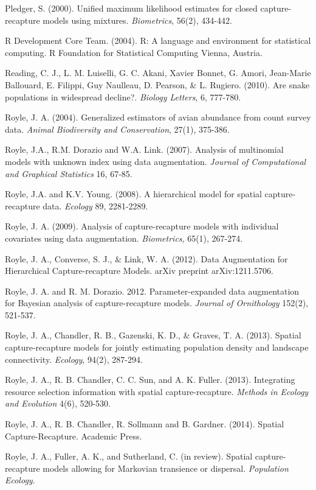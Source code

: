 \documentclass{book}
\begin{document}
\rf Pledger, S. (2000). Unified maximum likelihood estimates for closed capture-recapture models using mixtures. \textit{Biometrics}, 56(2), 434-442.

\rf R Development Core Team. (2004). R: A language and environment for statistical computing. R Foundation for Statistical Computing Vienna, Austria.

\rf Reading, C. J., L. M. Luiselli, G. C. Akani, Xavier Bonnet, G. Amori, Jean-Marie Ballouard, E. Filippi, Guy Naulleau, D. Pearson, \& L. Rugiero. (2010). Are snake populations in widespread decline?. \textit{Biology Letters}, 6, 777-780.

\rf Royle, J. A. (2004). Generalized estimators of avian abundance from count survey data. \textit{Animal Biodiversity and Conservation}, 27(1), 375-386.

\rf Royle, J.A., R.M. Dorazio and W.A. Link. (2007). Analysis of multinomial models with unknown index using data augmentation. {\it Journal of Computational and Graphical Statistics}  16, 67-85.

\rf Royle, J.A. and K.V. Young. (2008). A hierarchical model for spatial capture-recapture data. {\it Ecology}  89, 2281-2289.

\rf Royle, J. A. (2009). Analysis of capture-recapture models with individual covariates using data augmentation. {\it Biometrics}, 65(1), 267-274.

\rf Royle, J. A., Converse, S. J., \& Link, W. A. (2012). Data Augmentation for Hierarchical Capture-recapture Models. arXiv preprint arXiv:1211.5706.

\rf Royle, J. A. and R. M. Dorazio. 2012. Parameter-expanded data augmentation for Bayesian analysis of capture-recapture models. {\it Journal of Ornithology} 152(2), 521-537.

\rf Royle, J. A., Chandler, R. B., Gazenski, K. D., \& Graves, T. A. (2013). Spatial capture-recapture models for jointly estimating population density and landscape connectivity. \textit{Ecology}, 94(2), 287-294.

\rf Royle, J. A., R. B. Chandler, C. C. Sun, and A. K. Fuller. (2013). Integrating resource selection information with spatial capture-recapture. {\it Methods in Ecology and Evolution} 4(6), 520-530.

\rf Royle, J. A., R. B. Chandler, R. Sollmann and B. Gardner. (2014). Spatial Capture-Recapture. Academic Press.

\rf Royle, J. A., Fuller, A. K., and Sutherland, C. (in
review). Spatial capture-recapture models allowing for Markovian
transience or dispersal. {\it Population Ecology}.
\end{document}
